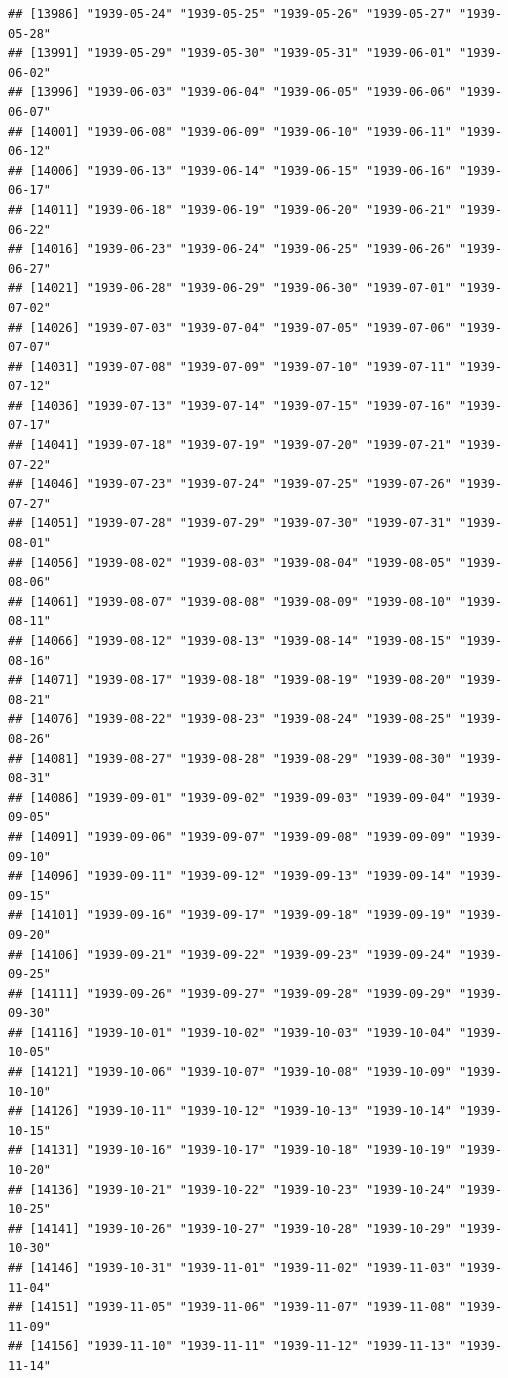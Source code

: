 \documentclass{article}\usepackage[]{graphicx}\usepackage[]{color}
\makeatletter
\newenvironment{kframe}{%
 \def\at@end@of@kframe{}%
 \ifinner\ifhmode%
  \def\at@end@of@kframe{\end{minipage}}%
  \begin{minipage}{\columnwidth}%
 \fi\fi%
 \def\FrameCommand##1{\hskip\@totalleftmargin \hskip-\fboxsep
 \colorbox{shadecolor}{##1}\hskip-\fboxsep
     \hskip-\linewidth \hskip-\@totalleftmargin \hskip\columnwidth}%
 \MakeFramed {\advance\hsize-\width
   \@totalleftmargin\z@ \linewidth\hsize
   \@setminipage}}%
 {\par\unskip\endMakeFramed%
 \at@end@of@kframe}
\newenvironment{knitrout}{}{} %
\makeatother
\begin{document}
\begin{description}
\begin{knitrout}
\begin{kframe}
\begin{verbatim}
## [13986] "1939-05-24" "1939-05-25" "1939-05-26" "1939-05-27" "1939-05-28"
## [13991] "1939-05-29" "1939-05-30" "1939-05-31" "1939-06-01" "1939-06-02"
## [13996] "1939-06-03" "1939-06-04" "1939-06-05" "1939-06-06" "1939-06-07"
## [14001] "1939-06-08" "1939-06-09" "1939-06-10" "1939-06-11" "1939-06-12"
## [14006] "1939-06-13" "1939-06-14" "1939-06-15" "1939-06-16" "1939-06-17"
## [14011] "1939-06-18" "1939-06-19" "1939-06-20" "1939-06-21" "1939-06-22"
## [14016] "1939-06-23" "1939-06-24" "1939-06-25" "1939-06-26" "1939-06-27"
## [14021] "1939-06-28" "1939-06-29" "1939-06-30" "1939-07-01" "1939-07-02"
## [14026] "1939-07-03" "1939-07-04" "1939-07-05" "1939-07-06" "1939-07-07"
## [14031] "1939-07-08" "1939-07-09" "1939-07-10" "1939-07-11" "1939-07-12"
## [14036] "1939-07-13" "1939-07-14" "1939-07-15" "1939-07-16" "1939-07-17"
## [14041] "1939-07-18" "1939-07-19" "1939-07-20" "1939-07-21" "1939-07-22"
## [14046] "1939-07-23" "1939-07-24" "1939-07-25" "1939-07-26" "1939-07-27"
## [14051] "1939-07-28" "1939-07-29" "1939-07-30" "1939-07-31" "1939-08-01"
## [14056] "1939-08-02" "1939-08-03" "1939-08-04" "1939-08-05" "1939-08-06"
## [14061] "1939-08-07" "1939-08-08" "1939-08-09" "1939-08-10" "1939-08-11"
## [14066] "1939-08-12" "1939-08-13" "1939-08-14" "1939-08-15" "1939-08-16"
## [14071] "1939-08-17" "1939-08-18" "1939-08-19" "1939-08-20" "1939-08-21"
## [14076] "1939-08-22" "1939-08-23" "1939-08-24" "1939-08-25" "1939-08-26"
## [14081] "1939-08-27" "1939-08-28" "1939-08-29" "1939-08-30" "1939-08-31"
## [14086] "1939-09-01" "1939-09-02" "1939-09-03" "1939-09-04" "1939-09-05"
## [14091] "1939-09-06" "1939-09-07" "1939-09-08" "1939-09-09" "1939-09-10"
## [14096] "1939-09-11" "1939-09-12" "1939-09-13" "1939-09-14" "1939-09-15"
## [14101] "1939-09-16" "1939-09-17" "1939-09-18" "1939-09-19" "1939-09-20"
## [14106] "1939-09-21" "1939-09-22" "1939-09-23" "1939-09-24" "1939-09-25"
## [14111] "1939-09-26" "1939-09-27" "1939-09-28" "1939-09-29" "1939-09-30"
## [14116] "1939-10-01" "1939-10-02" "1939-10-03" "1939-10-04" "1939-10-05"
## [14121] "1939-10-06" "1939-10-07" "1939-10-08" "1939-10-09" "1939-10-10"
## [14126] "1939-10-11" "1939-10-12" "1939-10-13" "1939-10-14" "1939-10-15"
## [14131] "1939-10-16" "1939-10-17" "1939-10-18" "1939-10-19" "1939-10-20"
## [14136] "1939-10-21" "1939-10-22" "1939-10-23" "1939-10-24" "1939-10-25"
## [14141] "1939-10-26" "1939-10-27" "1939-10-28" "1939-10-29" "1939-10-30"
## [14146] "1939-10-31" "1939-11-01" "1939-11-02" "1939-11-03" "1939-11-04"
## [14151] "1939-11-05" "1939-11-06" "1939-11-07" "1939-11-08" "1939-11-09"
## [14156] "1939-11-10" "1939-11-11" "1939-11-12" "1939-11-13" "1939-11-14"

\end{verbatim}
\end{kframe}
\end{knitrout}
\end{description}
\end{document}
